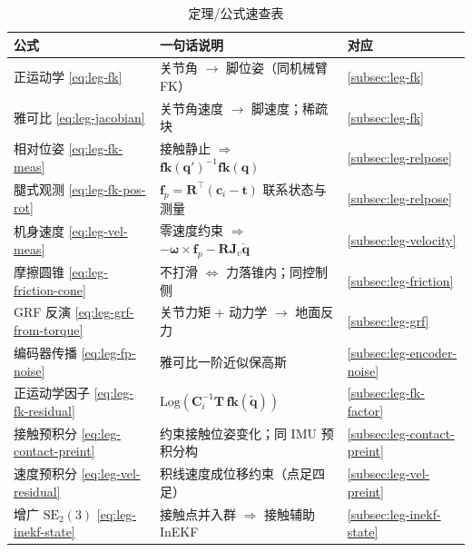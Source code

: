 \begin{table}[H]\centering\small
\caption{定理/公式速查表}
\begin{tabular}{lll}
\toprule
公式 & 一句话说明 & 对应 \\
\midrule
正运动学 \cref{eq:leg-fk} & 关节角 $\to$ 脚位姿（同机械臂 FK） & \cref{subsec:leg-fk} \\
雅可比 \cref{eq:leg-jacobian} & 关节角速度 $\to$ 脚速度；稀疏块 & \cref{subsec:leg-fk} \\
相对位姿 \cref{eq:leg-fk-meas} & 接触静止 $\Rightarrow$ $\mathbf{fk}(\mathbf{q}')^{-1}\mathbf{fk}(\mathbf{q})$ & \cref{subsec:leg-relpose} \\
腿式观测 \cref{eq:leg-fk-pos-rot} & $\mathbf{f}_p=\mathbf{R}^\top(\mathbf{c}_i-\mathbf{t})$ 联系状态与测量 & \cref{subsec:leg-relpose} \\
机身速度 \cref{eq:leg-vel-meas} & 零速度约束 $\Rightarrow$ $-\boldsymbol{\omega}\times\mathbf{f}_p-\mathbf{R}\mathbf{J}_v\dot{\mathbf{q}}$ & \cref{subsec:leg-velocity} \\
摩擦圆锥 \cref{eq:leg-friction-cone} & 不打滑 $\Leftrightarrow$ 力落锥内；同控制侧 & \cref{subsec:leg-friction} \\
GRF 反演 \cref{eq:leg-grf-from-torque} & 关节力矩 + 动力学 $\to$ 地面反力 & \cref{subsec:leg-grf} \\
编码器传播 \cref{eq:leg-fp-noise} & 雅可比一阶近似保高斯 & \cref{subsec:leg-encoder-noise} \\
正运动学因子 \cref{eq:leg-fk-residual} & $\mathrm{Log}(\mathbf{C}_i^{-1}\mathbf{T}\,\mathbf{fk}(\tilde{\mathbf{q}}))$ & \cref{subsec:leg-fk-factor} \\
接触预积分 \cref{eq:leg-contact-preint} & 约束接触位姿变化；同 IMU 预积分构 & \cref{subsec:leg-contact-preint} \\
速度预积分 \cref{eq:leg-vel-residual} & 积线速度成位移约束（点足四足） & \cref{subsec:leg-vel-preint} \\
增广 $\mathrm{SE}_2(3)$ \cref{eq:leg-inekf-state} & 接触点并入群 $\Rightarrow$ 接触辅助 InEKF & \cref{subsec:leg-inekf-state} \\
\bottomrule
\end{tabular}
\end{table}


